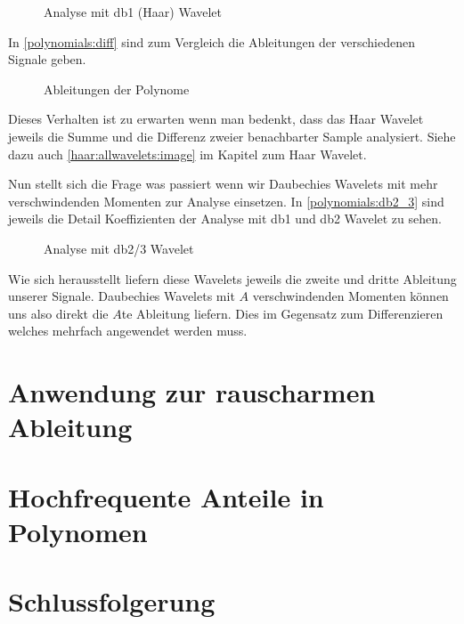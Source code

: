 \begin{refsection}
\begin{figure}
    \centering
    
    \caption{Analyse mit db1 (Haar) Wavelet\label{polynomials:haar}}
\end{figure}

In \autoref{polynomials:diff} sind zum Vergleich die Ableitungen der
verschiedenen Signale geben.

\begin{figure}
    \centering
    
    \caption{Ableitungen der Polynome\label{polynomials:diff}}
\end{figure}

Dieses Verhalten ist zu erwarten wenn man bedenkt, dass das Haar Wavelet
jeweils die Summe und die Differenz zweier benachbarter Sample analysiert.
Siehe dazu auch \autoref{haar:allwavelets:image} im Kapitel zum Haar Wavelet.

Nun stellt sich die Frage was passiert wenn wir Daubechies Wavelets mit mehr
verschwindenden Momenten zur Analyse einsetzen. In \autoref{polynomials:db2_3}
sind jeweils die Detail Koeffizienten der Analyse mit db1 und db2 Wavelet zu
sehen.

\begin{figure}
    \centering
    
    \caption{Analyse mit db2/3 Wavelet\label{polynomials:db2_3}}
\end{figure}

Wie sich herausstellt liefern diese Wavelets jeweils die zweite und dritte
Ableitung unserer Signale. Daubechies Wavelets mit $A$ verschwindenden Momenten
können uns also direkt die $A$te Ableitung liefern. Dies im Gegensatz zum
Differenzieren welches mehrfach angewendet werden muss.

\section{Anwendung zur rauscharmen Ableitung}

\section{Hochfrequente Anteile in Polynomen}

\section{Schlussfolgerung}

\printbibliography[heading=subbibliography]
\end{refsection}
